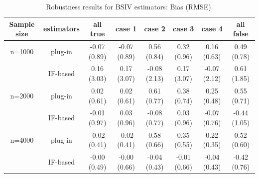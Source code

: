 \documentclass[10pt]{article}
\begin{document}
\begin{table}[t]\footnotesize
\centering
\begin{tabular}{c | c c c c c c c} 
 \hline
Sample size & estimators & all true & case 1 & case 2 & case 3 & case 4  & all false\\ [0.5ex] 
\hline
n=1000 & plug-in & -0.07 (0.89)  & -0.07 (0.89) & 0.56 (0.84) & 0.32 (0.96) & 0.16 (0.63) & 0.49 (0.78) \\
 & IF-based & 0.16 (3.03) & 0.17 (3.07) & -0.08 (2.13) & 0.17 (3.07) & -0.07 (2.12) & 0.61 (1.85) \\
\hline
n=2000 & plug-in & 0.02 (0.61) & 0.02 (0.61) & 0.61 (0.77) & 0.38 (0.74) & 0.25 (0.48) & 0.55 (0.71) \\
 & IF-based & -0.01 (0.97) & 0.03 (0.96) & -0.08 (0.77) & 0.03 (0.96) & -0.07 (0.76) & -0.44 (1.05)\\
 \hline
 n=4000 & plug-in & -0.02 (0.41) & -0.02 (0.41) & 0.58 (0.66) & 0.35 (0.55) & 0.22 (0.35) & 0.52 (0.60) \\
 & IF-based & -0.00 (0.49) & -0.00 (0.66) & -0.04 (0.43) & -0.01 (0.66) & -0.04 (0.43) & -0.42 (0.76) \\
\hline
\end{tabular}
\caption{Robustness results for BSIV estimators: Bias (RMSE).}
\label{BSIV_robustness_table}
\end{table}
\end{document}

